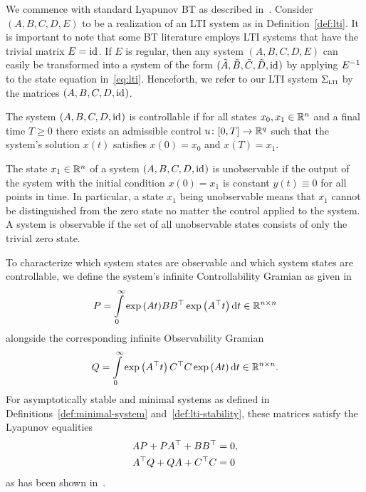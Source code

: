 We commence with standard Lyapunov \ac{BT} as described in~\cite{BB2017}.
Consider $(A, B, C, D, E)$ to be a realization of an \ac{LTI} system as in Definition~\ref{def:lti}.
It is important to note that some \ac{BT} literature employs \ac{LTI} systems that have the trivial matrix $E = \text{id}_{}$.
If $E$ is regular, then any system $(A, B, C, D, E)$ can easily be transformed into a system of the form $(\tilde{A}, \tilde{B}, \tilde{C}, \tilde{D}, \text{id}_{})$ by applying $E\inv$ to the state equation in~\eqref{eq:lti}.
Henceforth, we refer to our \ac{LTI} system $\Sigma_{\textnormal{\scshape lti}}$ by the matrices $(A, B, C, D, \text{id}_{})$.

\begin{definition}
    The system $(A, B, C, D, \text{id}_{})$ is controllable if for all states $x_0, x_1 \in \mathbb{R}^n$ and a final time $T \geq 0$ there exists an admissible control $u \colon \interval{0}{T} \to \bb{R}^q$ such that the system's solution $x(t)$ satisfies $x(0) = x_0$ and $x(T) = x_1$.
\end{definition}

\begin{definition}
    The state $x_1 \in \mathbb{R}^n$ of a system $(A, B, C, D, \text{id}_{})$ is unobservable if the output of the system with the initial condition $x(0) = x_1$ is constant $y(t) \equiv 0$ for all points in time.
    In particular, a state $x_1$ being unobservable means that $x_1$ cannot be distinguished from the zero state no matter the control applied to the system.
    A system is observable if the set of all unobservable states consists of only the trivial zero state.
\end{definition}

To characterize which system states are observable and which system states are controllable, we define the system's infinite Controllability Gramian as given in~\cite[Equation~6.8]{BB2017}
\begin{equation*}
    P = \int\limits_0^\infty \exp{(A t)} B B^{\top} \exp \left( A^{\top} t \right) \mathop{}\!\mathrm{d} t \in \mathbb{R}^{n \times n}
\end{equation*}
alongside the corresponding infinite Observability Gramian
\begin{equation*}
    Q = \int\limits_0^\infty \exp \left( A^{\top} t \right) C^{\top} C \exp{(A t)} \mathop{}\!\mathrm{d} t \in \mathbb{R}^{n \times n}.
\end{equation*}
For asymptotically stable and minimal systems as defined in Definitions~\ref{def:minimal-system} and~\ref{def:lti-stability}, these matrices satisfy the Lyapunov equalities
\begin{equation}\label{eq:lyapunov-equations}
    \begin{aligned}
        A P + P A^{\top} + B B^{\top} &= 0, \\
        A^{\top} Q + Q A + C^{\top} C &= 0
    \end{aligned}
\end{equation}
as has been shown in~\cite{Antoulas2005, Hinrichsen2005}.

